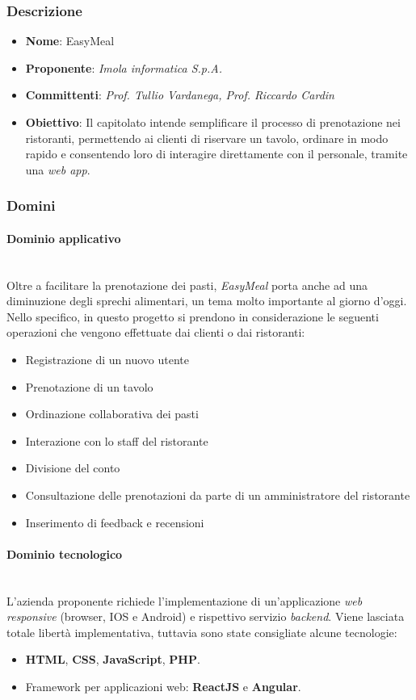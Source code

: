 \documentclass[italian,12pt]{article} %
\begin{document}
\subsubsection{Descrizione}
\begin{itemize}
	\item \textbf{Nome}: EasyMeal
	\item \textbf{Proponente}: {\it Imola informatica S.p.A.}
	\item \textbf{Committenti}: {\it Prof. Tullio Vardanega, Prof. Riccardo Cardin}
	\item \textbf{Obiettivo}: Il capitolato intende semplificare il processo di prenotazione nei ristoranti,
	      permettendo ai clienti di riservare un tavolo, ordinare in modo rapido e consentendo
	      loro di interagire direttamente con il personale, tramite una \textit{web app}.
\end{itemize}

\subsubsection{Domini}
\paragraph{Dominio applicativo}\mbox{}\\
Oltre a facilitare la prenotazione dei pasti, \textit{EasyMeal} porta anche ad una diminuzione degli sprechi alimentari, un tema molto importante al giorno d'oggi. \\
Nello specifico, in questo progetto si prendono in considerazione le seguenti operazioni che vengono effettuate dai clienti o dai ristoranti:
\begin{itemize}\itemsep0em
	\item Registrazione di un nuovo utente
	\item Prenotazione di un tavolo
	\item Ordinazione collaborativa dei pasti
	\item Interazione con lo staff del ristorante
	\item Divisione del conto
	\item Consultazione delle prenotazioni da parte di un amministratore del ristorante
	\item Inserimento di feedback e recensioni
\end{itemize}
\paragraph{Dominio tecnologico}\mbox{}\\
L'azienda proponente richiede l'implementazione di un'applicazione \textit{web responsive} (browser, IOS e Android) e rispettivo servizio \textit{backend}.
Viene lasciata totale libertà implementativa, tuttavia sono state consigliate alcune tecnologie:
\begin{itemize}
	\item \textbf{HTML}, \textbf{CSS}, \textbf{JavaScript}, \textbf{PHP}.
	\item Framework per applicazioni web: \textbf{ReactJS} e \textbf{Angular}.
\end{itemize}
\end{document}
